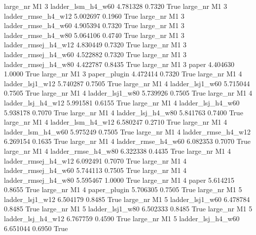   large_nr       M1                 3   ladder_lsm_h4_w60   4.781328      0.7320    True
  large_nr       M1                 3  ladder_rmse_h4_w12   5.002697      0.1960    True
  large_nr       M1                 3  ladder_rmse_h4_w60   4.905394      0.7320    True
  large_nr       M1                 3  ladder_rmse_h4_w80   5.064106      0.4740    True
  large_nr       M1                 3 ladder_rmsej_h4_w12   4.830449      0.7320    True
  large_nr       M1                 3 ladder_rmsej_h4_w60   4.522882      0.7320    True
  large_nr       M1                 3 ladder_rmsej_h4_w80   4.422787      0.8435    True
  large_nr       M1                 3               paper   4.404630      1.0000    True
  large_nr       M1                 3        paper_plugin   4.472414      0.7320    True
  large_nr       M1                 4     ladder_lsj1_w12   5.740287      0.7505    True
  large_nr       M1                 4     ladder_lsj1_w60   5.715044      0.7505    True
  large_nr       M1                 4     ladder_lsj1_w80   5.739926      0.7505    True
  large_nr       M1                 4   ladder_lsj_h4_w12   5.991581      0.6155    True
  large_nr       M1                 4   ladder_lsj_h4_w60   5.938178      0.7070    True
  large_nr       M1                 4   ladder_lsj_h4_w80   5.841763      0.7400    True
  large_nr       M1                 4   ladder_lsm_h4_w12   6.580247      0.2710    True
  large_nr       M1                 4   ladder_lsm_h4_w60   5.975249      0.7505    True
  large_nr       M1                 4  ladder_rmse_h4_w12   6.269154      0.1635    True
  large_nr       M1                 4  ladder_rmse_h4_w60   6.082353      0.7070    True
  large_nr       M1                 4  ladder_rmse_h4_w80   6.322338      0.4435    True
  large_nr       M1                 4 ladder_rmsej_h4_w12   6.092491      0.7070    True
  large_nr       M1                 4 ladder_rmsej_h4_w60   5.744113      0.7505    True
  large_nr       M1                 4 ladder_rmsej_h4_w80   5.595467      1.0000    True
  large_nr       M1                 4               paper   5.614215      0.8655    True
  large_nr       M1                 4        paper_plugin   5.706305      0.7505    True
  large_nr       M1                 5     ladder_lsj1_w12   6.504179      0.8485    True
  large_nr       M1                 5     ladder_lsj1_w60   6.478784      0.8485    True
  large_nr       M1                 5     ladder_lsj1_w80   6.502333      0.8485    True
  large_nr       M1                 5   ladder_lsj_h4_w12   6.767759      0.4590    True
  large_nr       M1                 5   ladder_lsj_h4_w60   6.651044      0.6950    True
